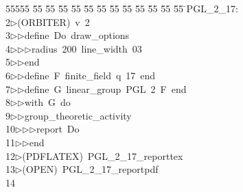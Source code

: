 %
%
\begin{tabbing}
55555 \= 55 \= 55 \= 55 \= 55 \= 55 \= 55 \= 55 \= 55 \= 55 \= 55 \= 55 \= 55 \= \>PGL\_2\_17:\\[0pt]
2\>$\triangleright$\>(ORBITER)\ v\ 2\ \\[0pt]
3\>$\triangleright$\>$\triangleright$\>define\ Do\ draw\_options\ \\[0pt]
4\>$\triangleright$\>$\triangleright$\>$\triangleright$\>radius\ 200\ line\_width\ 03\ \\[0pt]
5\>$\triangleright$\>$\triangleright$\>end\ \\[0pt]
6\>$\triangleright$\>$\triangleright$\>define\ F\ finite\_field\ q\ 17\ end\ \\[0pt]
7\>$\triangleright$\>$\triangleright$\>define\ G\ linear\_group\ PGL\ 2\ F\ end\ \\[0pt]
8\>$\triangleright$\>$\triangleright$\>with\ G\ do\ \\[0pt]
9\>$\triangleright$\>$\triangleright$\>group\_theoretic\_activity\ \\[0pt]
10\>$\triangleright$\>$\triangleright$\>$\triangleright$\>report\ Do\ \\[0pt]
11\>$\triangleright$\>$\triangleright$\>end\\[0pt]
12\>$\triangleright$\>(PDFLATEX)\ PGL\_2\_17\_reporttex\\[0pt]
13\>$\triangleright$\>(OPEN)\ PGL\_2\_17\_reportpdf\\[0pt]
14\>\end{tabbing}
